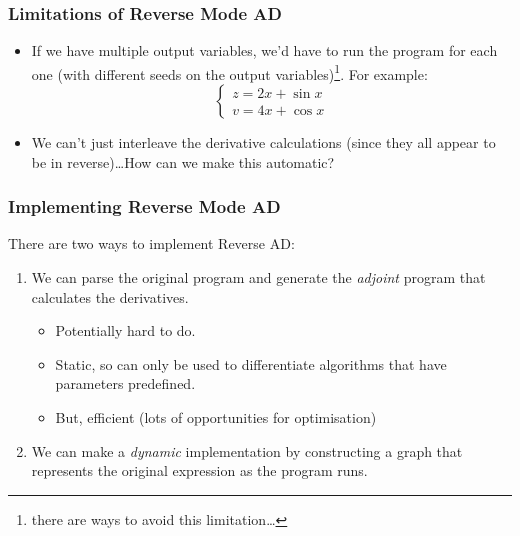 \documentclass[\beamerclass]{beamer}
\begin{document}
\begin{frame}
\frametitle{Limitations of Reverse Mode AD}

\begin{itemize}
	\item If we have multiple output variables, we'd have to run the program for each one (with different seeds on the output variables)\footnote{there are ways to avoid this limitation\ldots}. For example:
\[
   \begin{cases}
     z = 2x + \sin x\\
     v = 4x + \cos x
   \end{cases}
\]
	\item We can't just interleave the derivative calculations (since they all appear to be in reverse)\ldots How can we make this automatic?
\end{itemize}
\end{frame}

\begin{frame}
\frametitle{Implementing Reverse Mode AD}

There are two ways to implement Reverse AD:

\begin{enumerate}
	\item We can parse the original program and generate the \emph{adjoint} program that calculates the derivatives.
	\begin{itemize}
		\item Potentially hard to do.
		\item Static, so can only be used to differentiate algorithms that have parameters predefined.
		\item But, efficient (lots of opportunities for optimisation)
	\end{itemize}
	\item We can make a \emph{dynamic} implementation by constructing a graph that represents the original expression as the program runs.
\end{enumerate}
\end{frame}
\end{document}

